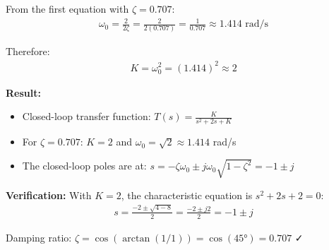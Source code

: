 \documentclass[11pt,a4paper]{article}
\begin{document}
From the first equation with $\zeta = 0.707$:
\begin{align}
  \omega_0 = \frac{2}{2\zeta} = \frac{2}{2(0.707)} = \frac{1}{0.707} \approx 1.414 \text{ rad/s}
\end{align}

Therefore:
\begin{align}
  K = \omega_0^2 = (1.414)^2 \approx 2
\end{align}

\textbf{Result:}
\begin{itemize}
  \item Closed-loop transfer function: $T(s) = \frac{K}{s^2 + 2s + K}$
  \item For $\zeta = 0.707$: $K = 2$ and $\omega_0 = \sqrt{2} \approx 1.414$ rad/s
  \item The closed-loop poles are at: $s = -\zeta\omega_0 \pm j\omega_0\sqrt{1-\zeta^2} = -1 \pm j$
\end{itemize}

\textbf{Verification:} With $K = 2$, the characteristic equation is $s^2 + 2s + 2 = 0$:
\begin{align}
  s = \frac{-2 \pm \sqrt{4-8}}{2} = \frac{-2 \pm j2}{2} = -1 \pm j
\end{align}

Damping ratio: $\zeta = \cos(\arctan(1/1)) = \cos(45°) = 0.707$ ✓
\end{document}
